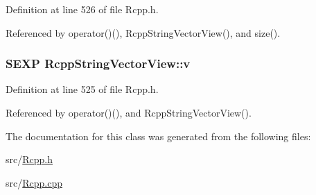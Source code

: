 Definition at line 526 of file Rcpp.h.

Referenced by operator()(), RcppStringVectorView(), and size().\hypertarget{classRcppStringVectorView_a1db3cc1a2dd1809151351c123343c15e}{
\subsubsection[{v}]{\setlength{\rightskip}{0pt plus 5cm}SEXP {\bf RcppStringVectorView::v}}}
\label{classRcppStringVectorView_a1db3cc1a2dd1809151351c123343c15e}


Definition at line 525 of file Rcpp.h.

Referenced by operator()(), and RcppStringVectorView().

The documentation for this class was generated from the following files:\begin{DoxyCompactItemize}
\item 
src/\hyperlink{Rcpp_8h}{Rcpp.h}\item 
src/\hyperlink{Rcpp_8cpp}{Rcpp.cpp}\end{DoxyCompactItemize}
